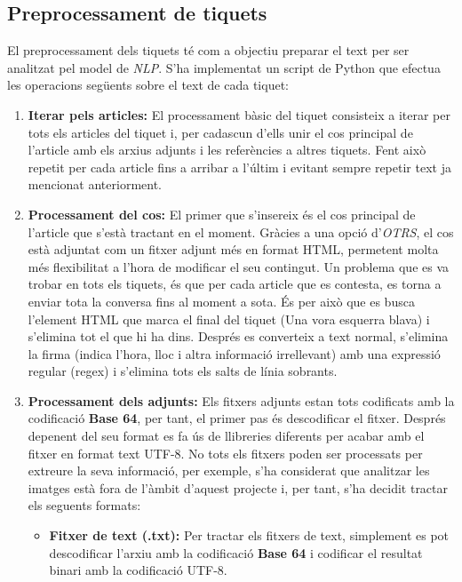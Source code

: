 \subsection{Preprocessament de tiquets}
El preprocessament dels tiquets té com a objectiu preparar el text per ser analitzat pel model de \textit{NLP}. S'ha implementat un script de Python que efectua les operacions següents sobre el text de cada tiquet:
\begin{enumerate}
     \item \textbf{Iterar pels articles:} El processament bàsic del tiquet consisteix a iterar per tots els articles del tiquet i, per cadascun d'ells unir el cos principal de l'article amb els arxius adjunts i les referències a altres tiquets. Fent això repetit per cada article fins a arribar a l'últim i evitant sempre repetir text ja mencionat anteriorment.
     \item \textbf{Processament del cos:} El primer que s'insereix és el cos principal de l'article que s'està tractant en el moment. Gràcies a una opció d'\textit{OTRS}, el cos està adjuntat com un fitxer adjunt més en format HTML, permetent molta més flexibilitat a l'hora de modificar el seu contingut. Un problema que es va trobar en tots els tiquets, és que per cada article que es contesta, es torna a enviar tota la conversa fins al moment a sota. És per això que es busca l'element HTML que marca el final del tiquet (Una vora esquerra blava) i s'elimina tot el que hi ha dins. Després es converteix a text normal, s'elimina la firma (indica l'hora, lloc i altra informació irrellevant) amb una expressió regular (regex) i s'elimina tots els salts de línia sobrants.
     \item \textbf{Processament dels adjunts:} Els fitxers adjunts estan tots codificats amb la codificació \textbf{Base 64}, per tant, el primer pas és descodificar el fitxer. Després depenent del seu format es fa ús de llibreries diferents per acabar amb el fitxer en format text UTF-8. No tots els fitxers poden ser processats per extreure la seva informació, per exemple, s'ha considerat que analitzar les imatges està fora de l'àmbit d'aquest projecte i, per tant, s'ha decidit tractar els seguents formats:
          \begin{itemize}
               \item \textbf{Fitxer de text (.txt):} Per tractar els fitxers de text, simplement es pot descodificar l'arxiu amb la codificació \textbf{Base 64} i codificar el resultat binari amb la codificació UTF-8.

\end{itemize}
\end{enumerate}
